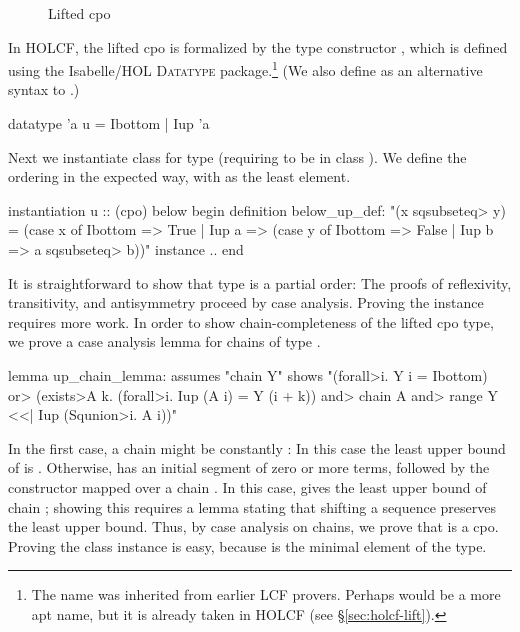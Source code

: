 \begin{figure}
\centering
{}
\caption{Lifted cpo}
\label{fig:holcf-lifted-cpo}
\end{figure}
 
In HOLCF, the lifted cpo is formalized by the type constructor , which is defined using the Isabelle/HOL \textsc{Datatype} package.\footnote{The name  was inherited from earlier LCF provers. Perhaps  would be a more apt name, but it is already taken in HOLCF (see \S\ref{sec:holcf-lift}).} (We also define  as an alternative syntax to .)
%
\begin{isacode}
datatype 'a u = Ibottom | Iup 'a
\end{isacode}
%
Next we instantiate class  for type  (requiring  to be in class ). We define the ordering in the expected way, with  as the least element.
%
\begin{isacode}
instantiation u :: (cpo) below
begin
  definition below_up_def: "(x \<sqsubseteq> y) =
    (case x of Ibottom => True | Iup a =>
      (case y of Ibottom => False | Iup b => a \<sqsubseteq> b))"
  instance ..
end
\end{isacode}
%
It is straightforward to show that type  is a partial order: The proofs of reflexivity, transitivity, and antisymmetry proceed by case analysis. Proving the  instance requires more work. In order to show chain-completeness of the lifted cpo type, we prove a case analysis lemma for chains of type .
%
\begin{isacode}
lemma up_chain_lemma:
  assumes "chain Y"
  shows "(\<forall>i. Y i = Ibottom) \<or>
    (\<exists>A k. (\<forall>i. Iup (A i) = Y (i + k)) \<and> chain A \<and> range Y <<| Iup (\<Squnion>i. A i))"
\end{isacode}
%
In the first case, a chain  might be constantly : In this case the least upper bound of  is . Otherwise,  has an initial segment of zero or more  terms, followed by the  constructor mapped over a chain . In this case,  gives the least upper bound of chain ; showing this requires a lemma stating that shifting a sequence preserves the least upper bound. Thus, by case analysis on chains, we prove that  is a cpo. Proving the  class instance is easy, because  is the minimal element of the type.

